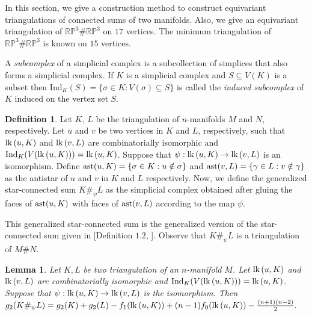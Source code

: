 \documentclass[11pt]{amsart}
\numberwithin{equation}{section}
\newtheorem{lemma}[theorem]{Lemma}
\theoremstyle{definition}
\newtheorem{defn}[theorem]{Definition}
\newcommand{\lk}{\mbox{\upshape lk}\,}
\begin{document}
In this section, we give a construction method to construct equivariant triangulations of connected sums of two manifolds. 
Also, we  give an equivariant triangulation of $\mathbb{RP}^3\#\mathbb{RP}^3$ on $17$ vertices.  The minimum triangulation of $\mathbb{RP}^3\#\mathbb{RP}^3$ is known on $15$ vertices.


A {\em subcomplex} of a simplicial complex is a subcollection of simplices that also forms a simplicial complex. If $K$ is a simplicial complex and $S\subseteq V(K)$ is a subset then $\mathrm{Ind}_{K}(S)=\{\sigma\in K: V(\sigma)\subseteq S\}$ is called the {\em induced subcomplex} of $K$ induced on the vertex set $S$.


\begin{defn}
 {\rm  Let $K$, $L$ be the triangulation of $n$-manifolds $M$ and $N$, respectively. Let $u$ and $v$ be two vertices in $K$ and $L$, respectively, such that $\lk(u,K)$ and $\lk(v,L)$ are combinatorially isomorphic and $
 \mathrm{Ind}_K(V(\lk(u,K)))=\lk(u,K)$. 
      Suppose that $\psi: \lk(u,K)\rightarrow \lk(v,L)$ is an isomorphism. Define ${\rm ast}(u,K)=\{\sigma\in K: u\notin \sigma\}$ and ${\rm ast}(v,L)=\{\gamma\in L: v\notin\gamma\}$ as the antistar of $u$ and $v$ in $K$ and $L$ respectively. Now, we define the generalized star-connected sum $K\#_{\psi}L$ as the simplicial complex obtained after gluing the faces of ${\rm ast}(u,K)$ with faces of  ${\rm ast}(v,L)$ according to the map $\psi$.} 
\end{defn}
 This generalized star-connected sum is the generalized version of the star-connected sum given in [Definition $1.2$, \cite{KNS}]. Observe that $K\#_{\psi}L$ is a triangulation of $M\#N$.



 \begin{lemma}\label{g2sum}
Let $K,L$ be two triangulation of an  $n$-manifold $M$. Let $\lk(u,K)$ and $\lk(v,L)$ are combinatorially isomorphic and $\mathrm{Ind}_K(V(\lk(u,K)))=\lk(u,K)$.  Suppose that $\psi: \lk(u,K)\rightarrow \lk(v,L)$ is the isomorphism. Then $g_2(K\#_{\psi}L)=g_2(K)+g_2(L)-f_1(\lk(u,K)) + {(n-1)f_0(\lk(u,K))-\frac{(n+1)(n-2)}{2}}.$
 \end{lemma}
\end{document}
